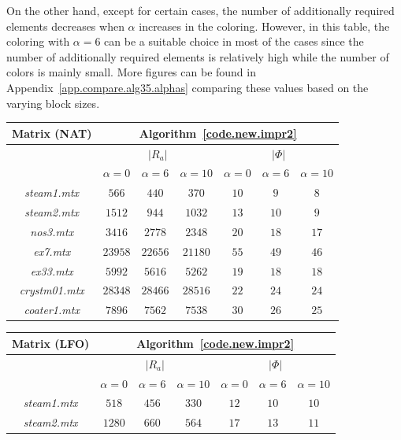 \documentclass[12pt, twoside,a4paper,toc=bibliography]{scrbook}
\newcommand{\coderef}[1]{Algorithm~\protect\ref{#1}}
\newcommand{\appref}[1]{Appendix~\protect\ref{#1}}
\begin{document}
On the other hand, except for certain cases,
the number of additionally required elements decreases
when $\alpha$ increases in the coloring.
However, in this table,
the coloring with $\alpha=6$ can be a suitable choice in most of the cases
since the number of additionally required elements is relatively high
while the number of colors is mainly small.
More figures can be found in \appref{app.compare.alg35.alphas} comparing these values
based on the varying block sizes.

\begin{table}
\centering
\begin{tabular}{|c|c|c|c|c|c|c|}
\hline
Matrix (NAT) & \multicolumn{6}{c|}{\coderef{code.new.impr2}} \\\hline
{} & \multicolumn{3}{c|}{$|R_{a}|$} & \multicolumn{3}{c|}{$|\Phi|$}\\\hline
{}     & $\alpha=0$ & $\alpha=6$ & $\alpha=10$ & $\alpha=0$& $\alpha=6$&$\alpha=10$ \\\hline
\textit{steam1.mtx} & $566$ & $440$ & $370$ & $10$ & $9$ & $8$ \\\hline
\textit{steam2.mtx} & $1512$ & $944$ & $1032$ & $13$ & $10$ & $9$ \\\hline
\textit{nos3.mtx} & $3416$ & $2778$ & $2348$ & $20$ & $18$ & $17$ \\\hline
\textit{ex7.mtx} & $23958$ & $22656$ & $21180$ & $55$ & $49$ & $46$ \\\hline
\textit{ex33.mtx} & $5992$ & $5616$ & $5262$ & $19$ & $18$ & $18$ \\\hline
\textit{crystm01.mtx} & $28348$ & $28466$ & $28516$ & $22$ & $24$ & $24$ \\\hline
\textit{coater1.mtx} & $7896$ & $7562$ & $7538$ & $30$ & $26$ & $25$ \\\hline
\end{tabular}
\vspace*{1cm}\newline
\begin{tabular}{|c|c|c|c|c|c|c|}
\hline
Matrix (LFO) & \multicolumn{6}{c|}{\coderef{code.new.impr2}} \\\hline
{} & \multicolumn{3}{c|}{$|R_{a}|$} & \multicolumn{3}{c|}{$|\Phi|$}\\\hline
{} & $\alpha=0$ & $\alpha=6$ & $\alpha=10$ & $\alpha=0$& $\alpha=6$&$\alpha=10$ \\\hline
\textit{steam1.mtx} & $518$ & $456$ & $330$ & $12$ & $10$ & $10$ \\\hline
\textit{steam2.mtx} & $1280$ & $660$ & $564$ & $17$ & $13$ & $11$ \\\hline

\end{tabular}
\end{table}
\end{document}

